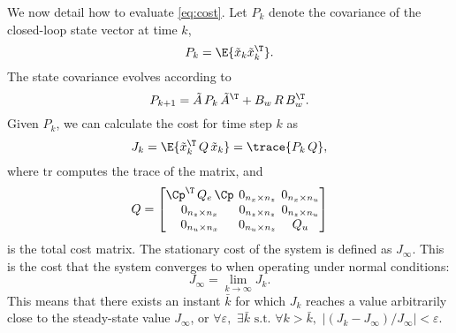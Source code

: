 We now detail how to evaluate \eqref{eq:cost}.
Let $P_k$ denote the covariance of the closed-loop state vector at time $k$,
%
\begin{equation}
\label{eq:covarcalc}
    P_k = \E{\tilde x_k \tilde x_k^\T }.
\end{equation}
%
The state covariance evolves according to
%
\begin{equation}
\label{eq:covevolution}
    P_{k+1} = \tilde A \,P_k\, \tilde A^\T + B_w \,R\, B_w^\T.
\end{equation}
%
Given $P_k$, we can calculate the cost for time step $k$ as
%
\begin{equation}
\label{eq:covartocost}
    J_k = \E{\tilde x_k^\T \,Q\, \tilde x_k } = \trace{P_k \,Q},
\end{equation}
%
where $\mathrm{tr}$ computes the trace of the matrix, and
%
\begin{equation}
    \setlength\arraycolsep{2pt}
    Q = \begin{bmatrix} 
        \Cp^\T\,Q_e\,\Cp                           & 0_{n_x \times n_z} & 0_{n_x \times n_u} \\
        0_{n_z \times n_x}  & 0_{n_z \times n_z}   & 0_{n_z \times n_u} \\
        0_{n_u \times n_x} & 0_{n_u \times n_z}  & Q_u
    \end{bmatrix} 
\end{equation}
%
is the total cost matrix.
The stationary cost of the system is defined as $J_\infty$.
This is the cost that the system converges to when operating under normal conditions:
%
\begin{equation}
    J_\infty = \lim_{k\rightarrow\infty} J_k.
\end{equation}
%
This means that there exists an instant $\bar{k}$ for which $J_k$ reaches a value arbitrarily close to the steady-state value $J_\infty$, or $\forall \varepsilon, \,\, \exists \bar{k} \text{~s.t.~} \forall k>\bar{k},\,\,|(J_k - J_\infty)/J_\infty| < \varepsilon$.
